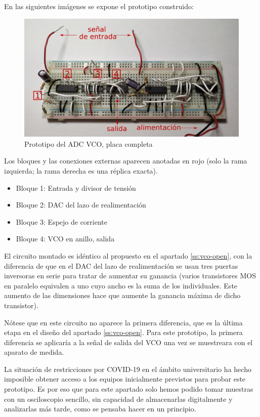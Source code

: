 \documentclass[12pt]{report} %
\begin{document}
	En las siguientes imágenes se expone el prototipo construido:
	
	\begin{figure}[H]
		\includegraphics[width=\textwidth]{proto-pcb-whole-annotated.png}
		\caption[Prototipo del ADC VCO, placa completa]{Prototipo del ADC VCO, placa completa}
		\label{fig:proto-pcb-whole-annotated.png}
	\end{figure}

	Los bloques y las conexiones externas aparecen anotadas en rojo (solo la rama izquierda; la rama derecha es una réplica exacta).
	
	\begin{itemize}
		\item Bloque 1: Entrada y divisor de tensión
		\item Bloque 2: DAC del lazo de realimentación
		\item Bloque 3: Espejo de corriente
		\item Bloque 4: VCO en anillo, salida
	\end{itemize}
	
	El circuito montado es idéntico al propuesto en el apartado \ref{ss:vco-open}, con la diferencia de que en el DAC del lazo de realimentación se usan tres puertas inversoras en serie para tratar de aumentar su ganancia (varios transistores MOS en paralelo equivalen a uno cuyo ancho es la suma de los individuales. Este aumento de las dimensiones hace que aumente la ganancia máxima de dicho transistor).
	
	Nótese que en este circuito no aparece la primera diferencia, que es la última etapa en el diseño del apartado \ref{ss:vco-open}. Para este prototipo, la primera diferencia se aplicaría a la señal de salida del VCO una vez se muestreara con el aparato de medida.
	
	La situación de restricciones por COVID-19 en el ámbito universitario ha hecho imposible obtener acceso a los equipos inicialmente previstos para probar este prototipo. Es por eso que para este apartado solo hemos podido tomar muestras con un osciloscopio sencillo, sin capacidad de almacenarlas digitalmente y analizarlas más tarde, como se pensaba hacer en un principio.
	
\end{document}
